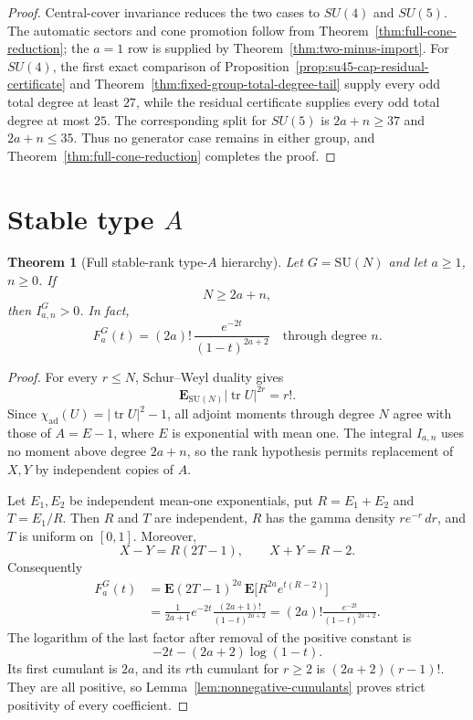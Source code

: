 \documentclass[11pt,reqno]{amsart}
\theoremstyle{plain}
\newtheorem{theorem}{Theorem}[section]
\theoremstyle{definition}
\newcommand{\chiad}{\chi_{\mathrm{ad}}}
\begin{document}
\begin{proof}
Central-cover invariance reduces the two cases to $SU(4)$ and $SU(5)$.
The automatic sectors and cone promotion follow from
Theorem~\ref{thm:full-cone-reduction}; the $a=1$ row is supplied by
Theorem~\ref{thm:two-minus-import}.  For $SU(4)$, the first exact comparison of
Proposition~\ref{prop:su45-cap-residual-certificate} and
Theorem~\ref{thm:fixed-group-total-degree-tail} supply every odd total
degree at least $27$, while the residual certificate supplies every odd
total degree at most $25$.  The corresponding split for $SU(5)$ is
$2a+n\geq37$ and $2a+n\leq35$.  Thus no generator case remains in either
group, and Theorem~\ref{thm:full-cone-reduction} completes the proof.
\end{proof}

\section{Stable type \texorpdfstring{$A$}{A}}

\begin{theorem}[Full stable-rank type-$A$ hierarchy]
\label{thm:stable-a-full}
Let $G=\mathrm{SU}(N)$ and let $a\geq1$, $n\geq0$.  If
\[
 N\geq 2a+n,
\]
then $I^{G}_{a,n}>0$.  In fact,
\[
 F_a^G(t)=(2a)!\,\frac{e^{-2t}}{(1-t)^{2a+2}}
 \quad\text{through degree }n.
\]
\end{theorem}

\begin{proof}
For every $r\leq N$, Schur--Weyl duality gives
\[
 \mathbf E_{\mathrm{SU}(N)}|\operatorname{tr}U|^{2r}=r!.
\]
Since $\chiad(U)=|\operatorname{tr}U|^2-1$, all adjoint moments through
degree $N$ agree with those of $A=E-1$, where $E$ is exponential with mean
one.  The integral $I_{a,n}$ uses no moment above degree $2a+n$, so the
rank hypothesis permits replacement of $X,Y$ by independent copies of
$A$.

Let $E_1,E_2$ be independent mean-one exponentials, put
$R=E_1+E_2$ and $T=E_1/R$.  Then $R$ and $T$ are independent,
$R$ has the gamma density $re^{-r}\,dr$, and $T$ is uniform on $[0,1]$.
Moreover,
\[
 X-Y=R(2T-1),\qquad X+Y=R-2.
\]
Consequently
\[
 \begin{aligned}
 F_a^G(t)
 &=\mathbf E(2T-1)^{2a}\,
   \mathbf E\bigl[R^{2a}e^{t(R-2)}\bigr]\\
 &=\frac1{2a+1}e^{-2t}
   \frac{(2a+1)!}{(1-t)^{2a+2}}
  =(2a)!\frac{e^{-2t}}{(1-t)^{2a+2}}.
 \end{aligned}
\]
The logarithm of the last factor after removal of the positive constant is
\[
 -2t-(2a+2)\log(1-t).
\]
Its first cumulant is $2a$, and its $r$th cumulant for $r\geq2$ is
$(2a+2)(r-1)!$.  They are all positive, so
Lemma~\ref{lem:nonnegative-cumulants} proves strict positivity of every
coefficient.
\end{proof}
\end{document}
